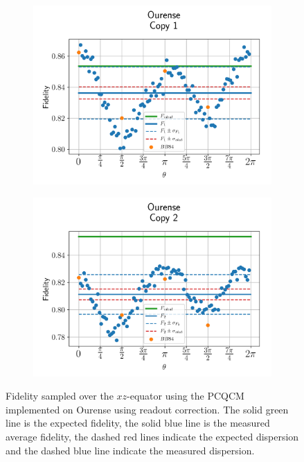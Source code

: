   
  \begin{figure}[H]
    \centering
    \begin{subfigure}{.5\textwidth}
      \centering
      \includegraphics[width=\textwidth]{Figures/PhaseCovariant/IBM/OnlyEquator/results_ourense_copy1.png}
      \label{fig:pc_uncorrected_ourense_equator_1}
    \end{subfigure}%
    \begin{subfigure}{.5\textwidth}
      \centering
      \includegraphics[width=\textwidth]{Figures/PhaseCovariant/IBM/OnlyEquator/results_ourense_copy2.png}
      \label{fig:pc_uncorrected_ourense_equator_2}
    \end{subfigure}
    \vspace{-0.5cm}
    \caption{Fidelity sampled over the $xz$-equator using the PCQCM implemented on Ourense using readout correction. The solid green line is the expected fidelity, the solid blue line is the measured average fidelity, the dashed red lines indicate the expected dispersion and the dashed blue line indicate the measured dispersion.}
    \label{fig:pc_uncorrected_ourense_equator}
  \end{figure}
  
